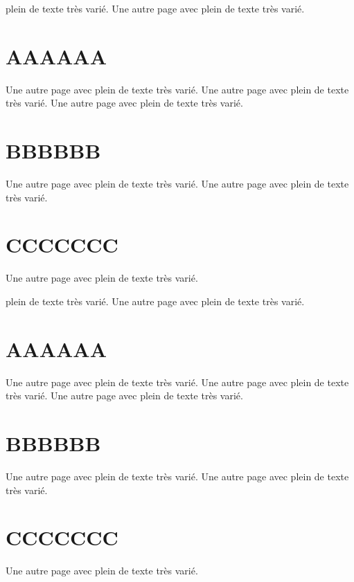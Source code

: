 \Annexes


    plein de texte très varié.
    Une autre page avec plein de texte très varié.

    \section{AAAAAA}

        Une autre page avec plein de texte très varié.
        Une autre page avec plein de texte très varié.
        Une autre page avec plein de texte très varié.

    \section{BBBBBB}

        Une autre page avec plein de texte très varié.
        Une autre page avec plein de texte très varié.

    \section{CCCCCCC}

        Une autre page avec plein de texte très varié.


    plein de texte très varié.
    Une autre page avec plein de texte très varié.

    \section{AAAAAA}

        Une autre page avec plein de texte très varié.
        Une autre page avec plein de texte très varié.
        Une autre page avec plein de texte très varié.

    \section{BBBBBB}

        Une autre page avec plein de texte très varié.
        Une autre page avec plein de texte très varié.

    \section{CCCCCCC}

        Une autre page avec plein de texte très varié.